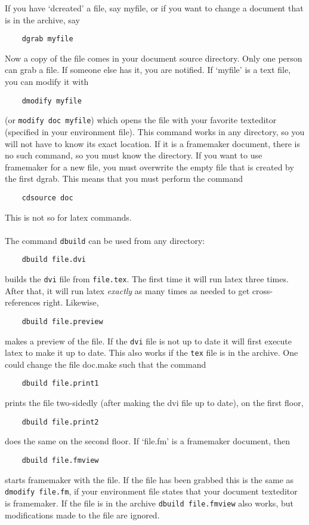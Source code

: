 If you have `dcreated' a file, say myfile, or if you want to change
a document that is in the archive, say
\begin{verbatim}
    dgrab myfile
\end{verbatim}
Now a copy of the file comes in your document source directory. 
Only one person
can grab a file. If someone else has it, you are notified. If `myfile' is a 
text file, you can modify it with 
\begin{verbatim}
    dmodify myfile
\end{verbatim}
(or {\tt modify doc myfile})
which opens the file with your favorite texteditor (specified in your
 environment file).
This command works in any directory, so you will not have to know its exact
location. If it is a framemaker
document, there is no such command, so you must know the directory.
 If you want to use framemaker for a new file, you 
must overwrite the empty file that is created by the first dgrab.
This means that you must perform the command 
\begin{verbatim}
    cdsource doc
\end{verbatim}
This is not so for latex commands.\\
\\
The command \verb+dbuild+
can be used from any directory:
\begin{verbatim}
    dbuild file.dvi
\end{verbatim}
builds the \verb+dvi+ file from \verb+file.tex+. The first time it will run 
latex
three times. After that, it will run latex {\em exactly} as many times as needed
to get cross-references right. Likewise,
\begin{verbatim}
    dbuild file.preview
\end{verbatim}
makes a preview of the file. If the \verb+dvi+ file is not up to date it
will first execute latex to make it up to date. This also works if
the \verb+tex+ file is in the archive. One could change the file doc.make
such that the command
\begin{verbatim}
    dbuild file.print1
\end{verbatim}
prints the file two-sidedly (after making the dvi file up to date), 
on the first floor,
\begin{verbatim}
    dbuild file.print2
\end{verbatim}
does the same on the second floor. 
If `file.fm' is a framemaker document, then
\begin{verbatim}
    dbuild file.fmview
\end{verbatim}
starts framemaker with the file. If the file has been grabbed this
is the same as {\tt dmodify file.fm}, if your environment file
states that your document texteditor is framemaker. If the
file is in the archive {\tt dbuild file.fmview} also works, but
modifications made to the file are ignored. 

